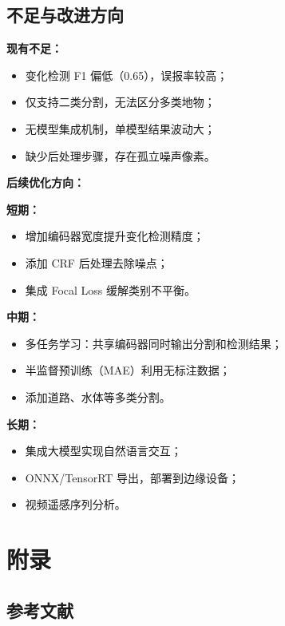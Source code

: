 \documentclass[12pt,a4paper]{article}
\begin{document}
\subsection{不足与改进方向}

\textbf{现有不足：}
\begin{itemize}
    \item 变化检测 F1 偏低（0.65），误报率较高；
    \item 仅支持二类分割，无法区分多类地物；
    \item 无模型集成机制，单模型结果波动大；
    \item 缺少后处理步骤，存在孤立噪声像素。
\end{itemize}

\textbf{后续优化方向：}

\textbf{短期：}
\begin{itemize}
    \item 增加编码器宽度提升变化检测精度；
    \item 添加 CRF 后处理去除噪点；
    \item 集成 Focal Loss 缓解类别不平衡。
\end{itemize}

\textbf{中期：}
\begin{itemize}
    \item 多任务学习：共享编码器同时输出分割和检测结果；
    \item 半监督预训练（MAE）利用无标注数据；
    \item 添加道路、水体等多类分割。
\end{itemize}

\textbf{长期：}
\begin{itemize}
    \item 集成大模型实现自然语言交互；
    \item ONNX/TensorRT 导出，部署到边缘设备；
    \item 视频遥感序列分析。
\end{itemize}

\section*{附录}

\subsection*{参考文献}
\end{document}
